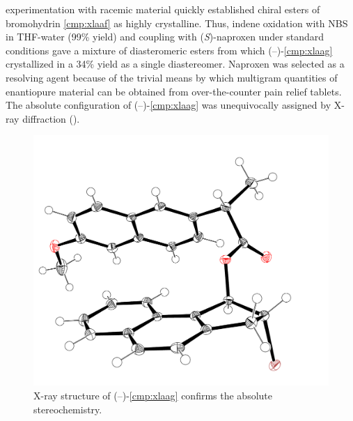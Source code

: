 experimentation with racemic material quickly established chiral esters of bromohydrin
\ref{cmp:xlaaf} as highly crystalline. Thus, indene oxidation with NBS in THF-water (99\% yield)
and coupling with (\textit{S})-naproxen under standard conditions gave a mixture of diasteromeric
esters from which (--)-\ref{cmp:xlaag} crystallized in a 34\% yield as a single diastereomer.
Naproxen was selected as a resolving agent because of the trivial means by which multigram quantities of
 enantiopure material can be obtained from over-the-counter pain relief tablets. The absolute
 configuration of (--)-\ref{cmp:xlaag} was unequivocally assigned by X-ray diffraction ().
 \begin{figure}[t]
  \centering
  \includegraphics[scale=0.35]{chp_asymmetric/images/xray/xlaag_nolabels}
  \caption{X-ray structure of (--)-\ref{cmp:xlaag} confirms the absolute stereochemistry.}
  \label{fig:asnaproxenxray}
\end{figure}
 
